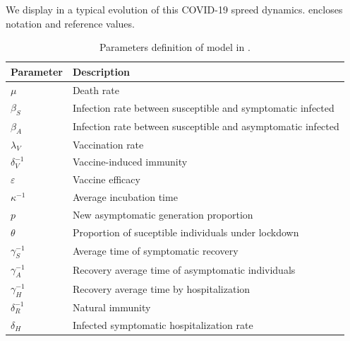     We display in  a typical evolution of this COVID-19 spreed dynamics.
 encloses notation and reference values.
%
\begin{table}[h!]
	\centering
	\begin{tabular}{>{\centering}%
        p{}%
        p{}
    }
    \toprule
		\textbf{Parameter} & \textbf{Description}
  	\\
  	\midrule
		$\mu$ &
			Death rate
		\\
        $\beta_S$ &
        	Infection rate between susceptible and symptomatic infected
		\\
        $\beta_A$ &
        	Infection rate between susceptible and asymptomatic infected
		\\
        $\lambda_V$ &
        	Vaccination rate
		\\
        $\delta_{V}^{-1}$ &
        Vaccine-induced immunity
		\\
        $\varepsilon$ &
        	Vaccine efficacy
		\\
        $\kappa^{-1}$ &
        	Average incubation time
        \\
		$p$ &
			New asymptomatic generation proportion
		\\
	    $\theta$ &
        	Proportion of suceptible individuals under lockdown
        \\
        $\gamma_{S}^{-1}$ &
        	Average time of symptomatic recovery
        \\
		$\gamma_{A}^{-1}$ &
			Recovery average time of asymptomatic individuals
		\\
		$\gamma_{H}^{-1}$ &
			Recovery average time by hospitalization
		\\
        $\delta_{R}^{-1}$ &
        	Natural immunity
  		\\
  		$\delta_{H}$ &
        	Infected symptomatic hospitalization rate
  		\\
  	\bottomrule
	\end{tabular}
		\caption{
			Parameters definition of model in
			.}
    \label{tbl:dynamics_base_parameters}
\end{table}
%
